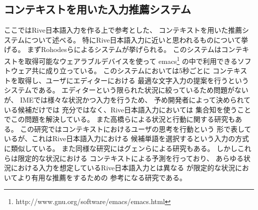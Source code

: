 \subsection{コンテキストを用いた入力推薦システム}
ここではRive日本語入力を作る上で参考とした、
コンテキストを用いた推薦システムについて述べる。
特にRive日本語入力に近いと思われるものについて挙げる。
まずRohodesらによるシステムが挙げられる。\cite{ROHODESB.J.:1997}
このシステムはコンテキストを取得可能なウェアラブルデバイスを使って
emacs\footnote{http://www.gnu.org/software/emacs/emacs.html}
の中で利用できるソフトウェア共に成り立っている。
このシステムにおいては5秒ごとに
コンテキストを取得し、ユーザにエディターにおける
最適な文字入力の提案を行うというシステムである。
エディターという限られた状況に絞っているため問題がないが、
IMEでは様々な状況かつ入力を行うため、
予め開発者によって決められている候補だけでは
充分ではなく、Rive日本語入力においては
集合知を使うことでこの問題を解決している。
また高橋らによる状況と行動に関する研究もある。
\cite{高橋公海:2013-07-15}
この研究ではコンテキストにおけるユーザの思考を行動という
形で表しているが、これはRive日本語入力における
候補単語を選択するという入力の方式に類似している。
また同様な研究にはグェンらによる研究もある。
\cite{ミンテイグェン:2010-01-15}
しかしこれらは限定的な状況における
コンテキストによる予測を行っており、
あらゆる状況における入力を想定しているRive日本語入力とは異なる
が限定的な状況においてより有用な推薦をするための
参考になる研究である。
